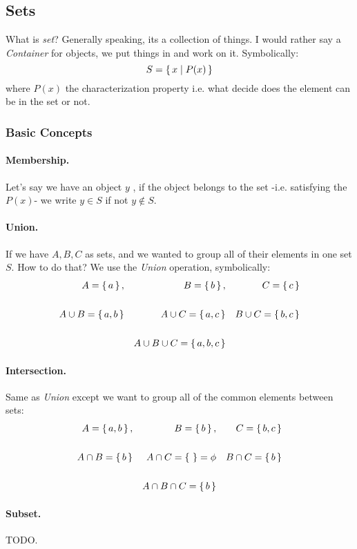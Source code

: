 \subsection{Sets}
What is {\it set}? Generally speaking, its a collection of things. I would rather say a {\it Container} for objects, we put things in and work on it. Symbolically:
$$
S = \set{x \mid P(x)}
$$
where $P(x)$ the characterization property i.e. what decide does the element can be in the set or not.
\subsubsection{Basic Concepts}
\paragraph{Membership.}
Let's say we have an object $y$ , if the object belongs to the set -i.e. satisfying the $P(x)$- we write $y \in S$ if not $y \not\in S$.
\paragraph{Union.}
If we have $A,B,C$ as sets, and we wanted to group all of their elements in one set $S$. How to do that? We use the {\it Union} operation, symbolically:
\begin{align*}
        \space A = \set{a} , && B = \set{b} , && C = \set{c} \\
        \\ 
        A \cup B = \set{a,b} && A \cup C = \set{a,c} && B \cup C = \set{b,c} \\
        \\
        && A \cup B \cup C = \set{a,b,c}
\end{align*}
\paragraph{Intersection.}
Same as {\it Union } except we want to group all of the common elements between sets:
\begin{align*}
        \space A = \set{a,b} , && B = \set{b} , && C = \set{b,c} \\
        \\ 
        A \cap B = \set{b} && A \cap C = \set{\space} = \phi && B \cap C = \set{b} \\
        \\
        && A \cap B \cap C = \set{b}
\end{align*}
\paragraph{Subset.}
TODO.
